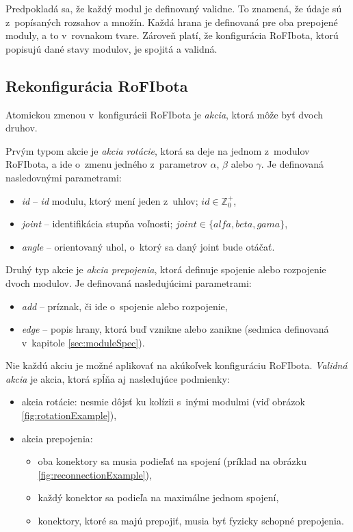 \documentclass[
  printed, %
  oneside, %
  notable,   %
  nolof,     %
  nolot,     %
]{fithesis3}
\begin{document}
Predpokladá sa, že každý modul je definovaný validne. To znamená, že údaje sú z~popísaných rozsahov a množín. Každá hrana je definovaná pre oba prepojené moduly, a to v~rovnakom tvare. Zároveň platí, že konfigurácia RoFIbota, ktorú popisujú dané stavy modulov, je spojitá a validná. 

\subsection{Rekonfigurácia RoFIbota}
\label{sec:formalRecfg}
Atomickou zmenou v~konfigurácii RoFIbota je \textit{akcia}, ktorá môže byť dvoch druhov. 

Prvým typom akcie je \textit{akcia rotácie}, ktorá sa deje na jednom z~modulov RoFIbota, a ide o~zmenu jedného z~parametrov $\alpha$, $\beta$ alebo $\gamma$. Je definovaná nasledovnými parametrami: 
\begin{itemize}
    \item \textit{id} -- \textit{id} modulu, ktorý mení jeden z~uhlov; $id \in \mathbb{Z}_0^+$, 
    \item \textit{joint} -- identifikácia stupňa voľnosti; $joint \in \{alfa, beta, gama\}$, 
    \item \textit{angle} -- orientovaný uhol, o~ktorý sa daný joint bude otáčať. 
\end{itemize}

Druhý typ akcie je \textit{akcia prepojenia}, ktorá definuje spojenie alebo rozpojenie dvoch modulov. Je definovaná nasledujúcimi parametrami: 
\begin{itemize}
    \item \textit{add} -- príznak, či ide o~spojenie alebo rozpojenie,
    \item \textit{edge} -- popis hrany, ktorá buď vznikne alebo zanikne (sedmica definovaná v~kapitole \ref{sec:moduleSpec}). 
\end{itemize}

Nie každú akciu je možné aplikovať na akúkoľvek konfiguráciu RoFIbota. \textit{Validná akcia} je akcia, ktorá spĺňa aj nasledujúce podmienky:
\begin{itemize}
    \item akcia rotácie: nesmie dôjsť ku kolízii s~inými modulmi (viď obrázok \ref{fig:rotationExample}), 
    \item akcia prepojenia: 
    \begin{itemize}[topsep=-5pt]
        \item oba konektory sa musia podieľať na spojení (príklad na obrázku \ref{fig:reconnectionExample}), 
        \item každý konektor sa podieľa na maximálne jednom spojení,
        \item konektory, ktoré sa majú prepojiť, musia byť fyzicky schopné prepojenia.
    \end{itemize}
\end{itemize}
\end{document}
